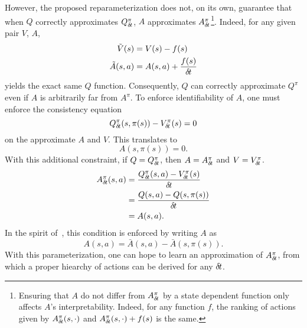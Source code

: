 However, the proposed reparameterization does not, on its own, guarantee that
when $Q$ correctly approximates $Q^\pi_{\delta\hspace{-.1em}t}$, $A$ approximates $A^\pi_{\delta\hspace{-.1em}t}$\footnote{
	Ensuring that $A$ do not differ from $A^\pi_{\delta\hspace{-.1em}t}$ by a state dependent function only affects
	$A$'s interpretability. Indeed, for any function $f$, the ranking of actions given by
	$A^\pi_{\delta\hspace{-.1em}t}(s, \cdot)$ and $A^\pi_{\delta\hspace{-.1em}t}(s, \cdot) + f(s)$ is the same.
}.
Indeed, for any given pair $V$, $A$,
\begin{align}
	\tilde{V}(s) &= V(s) - f(s)\\
	\tilde{A}(s, a) &= A(s, a) + \frac{f(s)}{{\delta\hspace{-.1em}t}}
\end{align}
yields the exact same $Q$ function. Consequently, $Q$ can correctly approximate
$Q^\pi$ even if $A$ is arbitrarily far from $A^\pi$.
To enforce identifiability of $A$, one must enforce the consistency equation
\begin{equation}
	Q^\pi_{\delta\hspace{-.1em}t}(s, \pi(s)) - V^\pi_{\delta\hspace{-.1em}t}(s) = 0
\end{equation}
on the approximate $A$ and $V$. This translates to
\begin{equation}
	A(s, \pi(s)) = 0.
\end{equation}
With this additional constraint, if $Q = Q^\pi_{\delta\hspace{-.1em}t}$, then $A = A^\pi_{\delta\hspace{-.1em}t}$ and $V = V^\pi_{\delta\hspace{-.1em}t}$.
\begin{align}
	A^\pi_{\delta\hspace{-.1em}t}(s, a) &= \frac{Q^\pi_{\delta\hspace{-.1em}t}(s,a) - V^\pi_{\delta\hspace{-.1em}t}(s)}{{\delta\hspace{-.1em}t}}\\
		    &= \frac{Q(s,a) - Q(s, \pi(s))}{{\delta\hspace{-.1em}t}}\\
		    &= A(s, a).
\end{align}
In the spirit of~\cite{dueling_nets}, this condition is enforced by writing $A$ as
\begin{equation}
\label{eq:Aparam}
	A(s, a) = \bar{A}(s, a) - \bar{A}(s, \pi(s)).
\end{equation}
With this parameterization, one can hope to learn an approximation of $A^\pi_{\delta\hspace{-.1em}t}$,
from which a proper hiearchy of actions can be derived for any ${\delta\hspace{-.1em}t}$.

